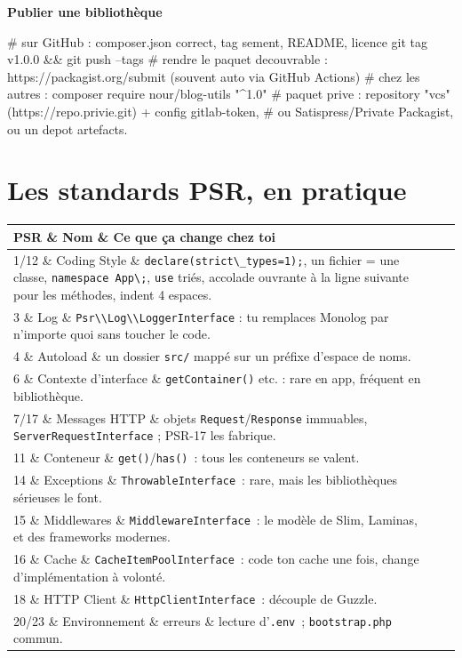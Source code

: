 \documentclass[12pt,a4paper,twoside,openright]{book}
\makeatletter
\newcommand{\etape}[1]{\par\medskip\noindent\textbf{\large #1}\par\smallskip}
\newenvironment{tabz}[1]{\rowcolors{2}{white}{tralight}%
  \small\setlength{\tabcolsep}{5pt}\setlength{\LTpre}{3pt}\setlength{\LTpost}{3pt}%
  \begin{longtable}{@{}#1@{}}\toprule}
  {\bottomrule\end{longtable}\normalfont\setlength{\tabcolsep}{6pt}}
\newcommand{\thd}[1]{\textbf{\color{white}#1}}
\newcommand{\headrow}{\rowcolor{theadbg}}
\makeatother
\begin{document}
\etape{Publier une biblioth\`eque}
\begin{terminal}
# sur GitHub : composer.json correct, tag sement, README, licence
git tag v1.0.0 && git push --tags
# rendre le paquet decouvrable : https://packagist.org/submit (souvent auto via GitHub Actions)
# chez les autres : composer require nour/blog-utils "^1.0"
# paquet prive : repository "vcs" (https://repo.privie.git) + config gitlab-token,
#   ou Satispress/Private Packagist, ou un depot artefacts.
\end{terminal}

\section{Les standards PSR, en pratique}

\begin{tabz}{llX}
  \headrow \thd{PSR} \& \thd{Nom} \& \thd{Ce que \c{c}a change chez toi} \\
  \midrule
  1/12 \& Coding Style \& \verb|declare(strict\_types=1);|, un fichier = une classe, \verb|namespace App\;|, \verb|use| tri\'es, accolade ouvrante \`a la ligne suivante pour les m\'ethodes, indent 4 espaces. \\
  3 \& Log \& \verb|Psr\\Log\\LoggerInterface| : tu remplaces Monolog par n'importe quoi sans toucher le code. \\
  4 \& Autoload \& un dossier \verb|src/| mapp\'e sur un pr\'efixe d'espace de noms. \\
  6 \& Contexte d'interface \& \verb|getContainer()| etc. : rare en app, fr\'equent en biblioth\`eque. \\
  7/17 \& Messages HTTP \& objets \verb|Request|/\verb|Response| immuables, \verb|ServerRequestInterface| ; PSR-17 les fabrique. \\
  11 \& Conteneur \& \verb|get()|/\verb|has()|~: tous les conteneurs se valent. \\
  14 \& Exceptions \& \verb|ThrowableInterface|~: rare, mais les biblioth\`eques s\'erieuses le font. \\
  15 \& Middlewares \& \verb|MiddlewareInterface|~: le mod\`ele de Slim, Laminas, et des frameworks modernes. \\
  16 \& Cache \& \verb|CacheItemPoolInterface|~: code ton cache une fois, change d'impl\'ementation \`a volont\'e. \\
  18 \& HTTP Client \& \verb|HttpClientInterface|~: d\'ecouple de Guzzle. \\
  20/23 \& Environnement \& erreurs \& lecture d'\verb|.env|~; \verb|bootstrap.php| commun. \\
\end{tabz}
\end{document}
